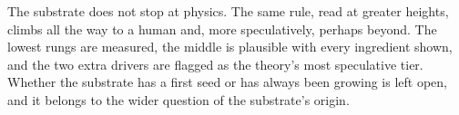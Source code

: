 The substrate does not stop at physics. The same rule, read at greater heights, climbs all the way to a human and,
more speculatively, perhaps beyond. The lowest rungs are measured, the middle is plausible with every ingredient
shown, and the two extra drivers are flagged as the theory's most speculative tier. Whether the substrate has a first seed or has always been growing is left open, and it belongs to the wider question of the
substrate's origin.
